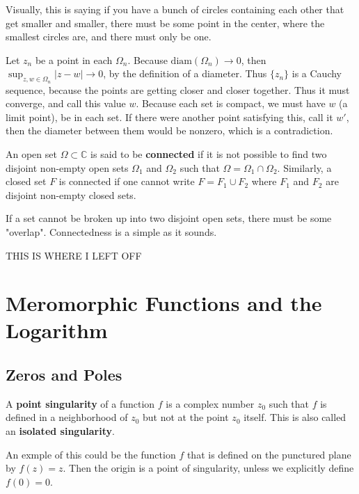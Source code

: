 \documentclass[12pt]{article}
\newcommand{\C}{\mathbb{C}}
\begin{document}
Visually, this is saying if you have a bunch of circles containing each other that get smaller and smaller, 
there must be some point in the center, where the smallest circles are, and there must only be one. 

\begin{newproof}
  Let $z_n$ be a point in each $\Omega_n$. Because $\text{diam}(\Omega_n) \to 0$, then 
  $\sup_{z,w \in \Omega_n} \vert z - w \vert \to 0$, by the definition of a diameter. Thus $\{ z_n \}$ is 
  a Cauchy sequence, because the points are getting closer and closer together. Thus it must converge, and 
  call this value $w$. Because each set is compact, we must have $w$ (a limit point), be in each set. If there 
  were another point satisfying this, call it $w'$, then the diameter between them would be nonzero, which is 
  a contradiction.
\end{newproof}

\begin{definition}
  An open set $\Omega \subset \C$ is said to be \textbf{connected} if it is not possible to find two disjoint 
  non-empty open sets $\Omega_1$ and $\Omega_2$ such that $\Omega = \Omega_1 \cap \Omega_2$. 
  Similarly, a closed set $F$ is connected if one cannot write $F = F_1 \cup F_2$ where $F_1$ and 
  $F_2$ are disjoint non-empty closed sets.
\end{definition}

If a set cannot be broken up into two disjoint open sets, there must be some "overlap". Connectedness 
is a  simple as it sounds.

{\Huge THIS IS WHERE I LEFT OFF}

\section{Meromorphic Functions and the Logarithm}

\subsection{Zeros and Poles}

\begin{definition}
  A \textbf{point singularity} of a function $f$ is a complex number $z_0$ such that $f$ is defined in a 
  neighborhood of $z_0$ but not at the point $z_0$ itself. This is also called an \textbf{isolated singularity}.
\end{definition}

An exmple of this could be the function $f$ that is defined on the punctured plane by $f(z)=z$. Then the 
origin is a point of singularity, unless we explicitly define $f(0)=0$. 
\end{document}
